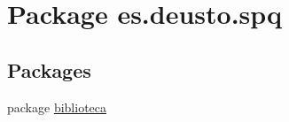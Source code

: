 \hypertarget{namespacees_1_1deusto_1_1spq}{}\section{Package es.\+deusto.\+spq}
\label{namespacees_1_1deusto_1_1spq}
\subsection*{Packages}
\begin{DoxyCompactItemize}
\item 
package \mbox{\hyperlink{namespacees_1_1deusto_1_1spq_1_1biblioteca}{biblioteca}}
\end{DoxyCompactItemize}
